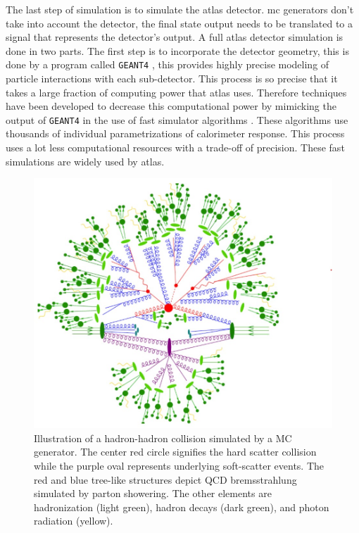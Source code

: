 The last step of simulation is to simulate the \gls{atlas} detector. \gls{mc} generators don't take into account the detector, the final state output needs to be translated to a 
signal that represents the detector's output. A full \gls{atlas} detector simulation is done in two parts. The first step is to incorporate the detector geometry, this is done 
by a program called \texttt{GEANT4} \cite{geant4}, this provides highly precise modeling of particle interactions with each sub-detector. This process is so precise that it takes a large 
fraction of computing power that \gls{atlas} uses. Therefore techniques have been developed to decrease this computational power by mimicking the output of \texttt{GEANT4} in the 
use of fast simulator algorithms \cite{fastsim}. These algorithms use thousands of individual parametrizations of calorimeter response. This process uses a lot less computational resources with 
a trade-off of precision. These fast simulations are widely used by \gls{atlas}.

\begin{figure}[H]
    \centering
    \includegraphics[scale=0.65]{figs/ch4/mc-diagram.jpg}
    \caption{ Illustration of a hadron-hadron collision simulated by a MC generator. The center red circle signifies the hard scatter collision while the purple oval represents underlying soft-scatter events. The red and blue tree-like structures depict QCD bremsstrahlung simulated by parton showering. The other elements are hadronization (light green), hadron decays (dark green), and photon radiation (yellow). \cite{parton-showering}}
\label{fig:mc-diagram}
\end{figure}
